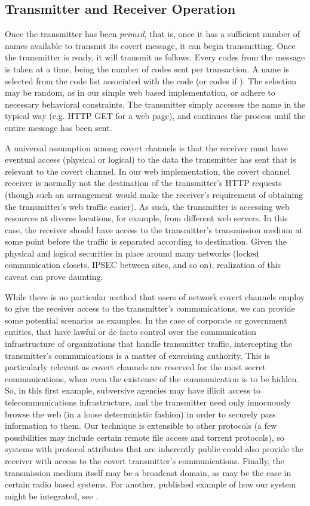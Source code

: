 \documentclass[10pt, conference]{IEEEtran}
\begin{document}
\subsection{Transmitter and Receiver Operation}
Once the transmitter has been {\em primed}, that is, once it has a sufficient number of names available to transmit its covert message, it can begin transmitting.  Once the transmitter is ready, it will transmit as follows.  Every  codes from the message is taken at a time,  being the number of codes sent per transaction.  A name is selected from the code list associated with the code (or codes if ).  The selection may be random, as in our simple web based implementation, or adhere to necessary behavioral constraints.  The transmitter simply accesses the name in the typical way (e.g. HTTP GET for a web page), and continues the process until the entire message has been sent.

A universal assumption among covert channels is that the receiver must have eventual access (physical or logical) to the data the transmitter has sent that is relevant to the covert channel.  In our web implementation, the covert channel receiver is normally not the destination of the transmitter's HTTP requests (though such an arrangement would make the receiver's requirement of obtaining the transmitter's web traffic easier).  As such, the transmitter is accessing web resources at diverse locations, for example, from different web servers.  In this case, the receiver should have access to the transmitter's transmission medium at some point before the traffic is separated according to destination.  Given the physical and logical securities in place around many networks (locked communication closets, IPSEC between sites, and so on), realization of this caveat can prove daunting.

While there is no particular method that users of network covert channels employ to give the receiver access to the transmitter's communications, we can provide some potential scenarios as examples.  In the case of corporate or government entities, that have lawful or de facto control over the communication infrastructure of organizations that handle transmitter traffic, intercepting the transmitter's communications is a matter of exercising authority.  This is particularly relevant as covert channels are reserved for the most secret communications, when even the existence of the communication is to be hidden.  So, in this first example, subversive agencies may have illicit access to telecommunications infrastructure, and the transmitter need only innocuously browse the web (in a loose deterministic fashion) in order to securely pass information to them.  Our technique is extensible to other protocols (a few possibilities may include certain remote file access and torrent protocols), so systems with protocol attributes that are inherently public could also provide the receiver with access to the covert transmitter's communications.  Finally, the transmission medium itself may be a broadcast domain, as may be the case in certain radio based systems.  For another, published example of how our system might be integrated, see \cite{Girling87}.
\end{document}
